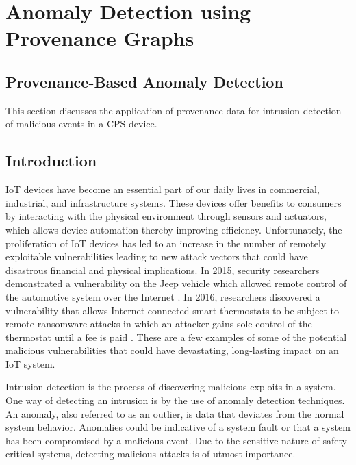
\chapter{Anomaly Detection using Provenance Graphs}
\section{Provenance-Based Anomaly Detection} \label{sec:prov_anomaly}
This section discusses the application of provenance data for intrusion detection of malicious events in a CPS device. 


\section{Introduction}

IoT devices have become an essential part of our daily lives in commercial, industrial, and infrastructure systems. These devices offer benefits to consumers by interacting with the physical environment through sensors and actuators, which allows device automation thereby improving efficiency. Unfortunately, the proliferation of IoT devices has led to an increase in the number of remotely exploitable vulnerabilities leading to new attack vectors that could have disastrous financial and physical implications. In 2015, security researchers demonstrated a vulnerability on the Jeep vehicle which allowed remote control of the automotive system over the Internet \cite{jeep_vulnerabilty}. In 2016, researchers discovered a vulnerability that allows Internet connected smart thermostats to be subject to remote ransomware attacks in which an attacker gains sole control of the thermostat until a fee is paid \cite{smart_thermostat}. These are a few examples of some of the potential malicious vulnerabilities that could have devastating, long-lasting impact on an IoT system. \par Intrusion detection \cite{Lazarevic2005} is the process of discovering malicious exploits in a system. One way of detecting an intrusion is by the use of anomaly detection techniques. An anomaly, also referred to as an outlier, is data that deviates from the normal system behavior. Anomalies could be indicative of a system fault or that a system has been compromised by a malicious event. Due to the sensitive nature of safety critical systems, detecting malicious attacks is of utmost importance.

